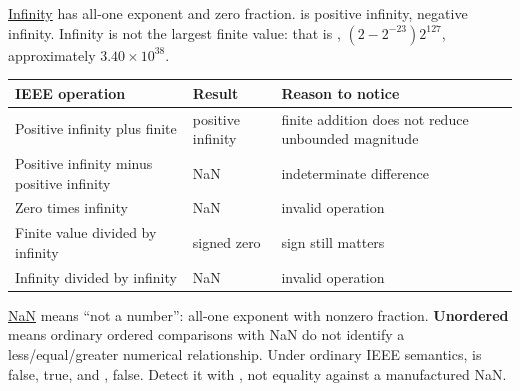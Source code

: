 \hyperref[appendix-eb336149c00a]{Infinity} has all-one exponent and zero fraction.  is positive infinity,  negative infinity. Infinity is not the largest finite value: that is , \((2-2^{-23})2^{127}\), approximately \(3.40\times10^{38}\).

{\def\LTcaptype{none} %
\begin{longtable}[]{@{}
  >{\raggedright\arraybackslash}p{}
  >{\raggedright\arraybackslash}p{}
  >{\raggedright\arraybackslash}p{}@{}}
\toprule\noalign{}
\begin{minipage}[b]{\linewidth}\raggedright
IEEE operation
\end{minipage} & \begin{minipage}[b]{\linewidth}\raggedright
Result
\end{minipage} & \begin{minipage}[b]{\linewidth}\raggedright
Reason to notice
\end{minipage} \\
\midrule\noalign{}
\endhead
\bottomrule\noalign{}
\endlastfoot
Positive infinity plus finite & positive infinity & finite addition does not reduce unbounded magnitude \\
Positive infinity minus positive infinity & NaN & indeterminate difference \\
Zero times infinity & NaN & invalid operation \\
Finite value divided by infinity & signed zero & sign still matters \\
Infinity divided by infinity & NaN & invalid operation \\
\end{longtable}
}

\hyperref[appendix-d6607cc4c235]{NaN} means ``not a number'': all-one exponent with nonzero fraction. \textbf{Unordered} means ordinary ordered comparisons with NaN do not identify a less/equal/greater numerical relationship. Under ordinary IEEE semantics,  is false,  true, and ,  false. Detect it with , not equality against a manufactured NaN.

